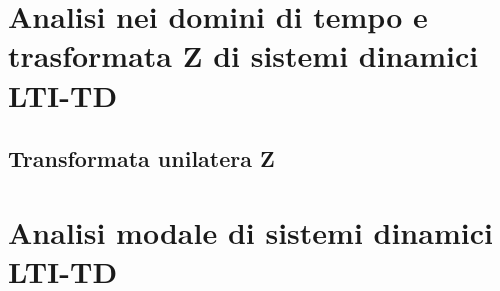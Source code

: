 \documentclass[../main.tex]{subfiles}
\begin{document}
\clearpage
\thispagestyle{empty}
\vspace*{7cm}
\section{Analisi nei domini di tempo e trasformata Z di sistemi dinamici LTI-TD}
\vspace*{1.5cm}


\subsection{Transformata unilatera Z}








\clearpage
\thispagestyle{empty}
\vspace*{7cm}
\section{Analisi modale di sistemi dinamici LTI-TD}
\vspace*{1.5cm}
\end{document}
